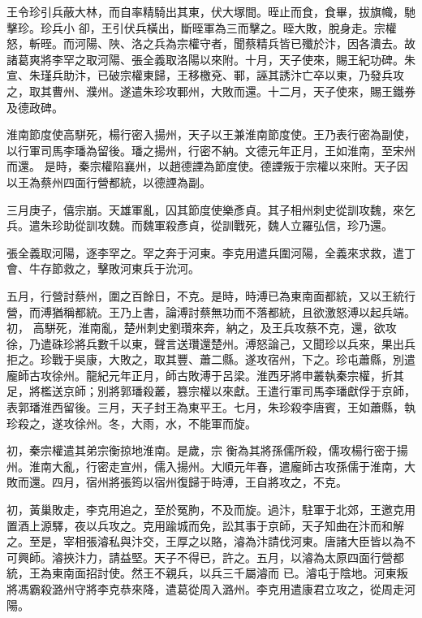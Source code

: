 \begin{pinyinscope}
 王令珍引兵蔽大林，而自率精騎出其東，伏大塚間。晊止而食，食畢，拔旗幟，馳擊珍。珍兵小
 卻，王引伏兵橫出，斷晊軍為三而擊之。晊大敗，脫身走。宗權怒，斬晊。而河陽、陜、洛之兵為宗權守者，聞蔡精兵皆已殲於汴，因各潰去。故諸葛爽將李罕之取河陽、張全義取洛陽以來附。十月，天子使來，賜王紀功碑。朱宣、朱瑾兵助汴，已破宗權東歸，王移檄兗、鄆，誣其誘汴亡卒以東，乃發兵攻之，取其曹州、濮州。遂遣朱珍攻鄆州，大敗而還。十二月，天子使來，賜王鐵券及德政碑。



 淮南節度使高駢死，楊行密入揚州，天子以王兼淮南節度使。王乃表行密為副使，以行軍司馬李璠為留後。璠之揚州，行密不納。文德元年正月，王如淮南，至宋州而還。
 是時，秦宗權陷襄州，以趙德諲為節度使。德諲叛于宗權以來附。天子因以王為蔡州四面行營都統，以德諲為副。



 三月庚子，僖宗崩。天雄軍亂，囚其節度使樂彥貞。其子相州刺史從訓攻魏，來乞兵。遣朱珍助從訓攻魏。而魏軍殺彥貞，從訓戰死，魏人立羅弘信，珍乃還。



 張全義取河陽，逐李罕之。罕之奔于河東。李克用遣兵圍河陽，全義來求救，遣丁會、牛存節救之，擊敗河東兵于沇河。



 五月，行營討蔡州，圍之百餘日，不克。是時，時溥已為東南面都統，又以王統行營，而溥猶稱都統。王乃上書，論溥討蔡無功而不落都統，且欲激怒溥以起兵端。初，
 高駢死，淮南亂，楚州刺史劉瓚來奔，納之，及王兵攻蔡不克，還，欲攻徐，乃遣硃珍將兵數千以東，聲言送瓚還楚州。溥怒論己，又聞珍以兵來，果出兵拒之。珍戰于吳康，大敗之，取其豐、蕭二縣。遂攻宿州，下之。珍屯蕭縣，別遣龐師古攻徐州。龍紀元年正月，師古敗溥于呂梁。淮西牙將申叢執秦宗權，折其足，將檻送京師；別將郭璠殺叢，篡宗權以來獻。王遣行軍司馬李璠獻俘于京師，表郭璠淮西留後。三月，天子封王為東平王。七月，朱珍殺李唐賓，王如蕭縣，執珍殺之，遂攻徐州。冬，大雨，水，不能軍而旋。



 初，秦宗權遣其弟宗衡掠地淮南。是歲，宗
 衡為其將孫儒所殺，儒攻楊行密于揚州。淮南大亂，行密走宣州，儒入揚州。大順元年春，遣龐師古攻孫儒于淮南，大敗而還。四月，宿州將張筠以宿州復歸于時溥，王自將攻之，不克。



 初，黃巢敗走，李克用追之，至於冤朐，不及而旋。過汴，駐軍于北郊，王邀克用置酒上源驛，夜以兵攻之。克用踰城而免，訟其事于京師，天子知曲在汴而和解之。至是，宰相張濬私與汴交，王厚之以賂，濬為汴請伐河東。唐諸大臣皆以為不可興師。濬挾汴力，請益堅。天子不得已，許之。五月，以濬為太原四面行營都統，王為東南面招討使。然王不親兵，以兵三千屬濬而
 已。濬屯于陰地。河東叛將馮霸殺潞州守將李克恭來降，遣葛從周入潞州。李克用遣康君立攻之，從周走河陽。




\end{pinyinscope}
